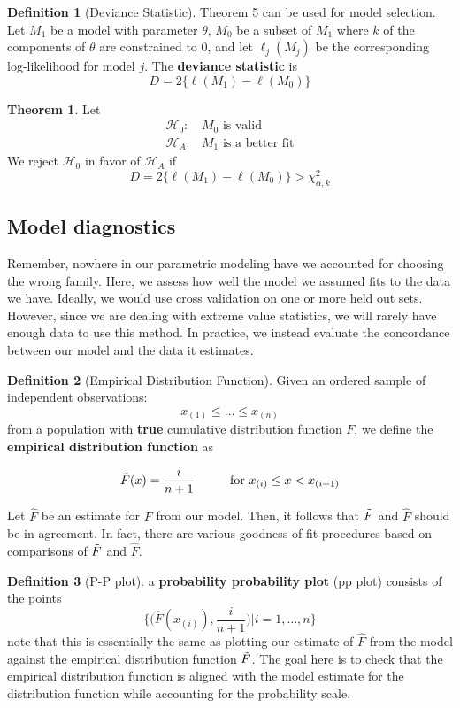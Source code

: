 \documentclass{article}
\theoremstyle{definition}
\newtheorem{theorem}{Theorem}
\theoremstyle{definition}
\newtheorem{definition}{Definition}
\def\l{\ell}
\begin{document}
\begin{definition}[Deviance Statistic]
Theorem 5 can be used for model selection. Let $M_1$ be a model with parameter $\theta$, $M_0$ be a subset of $M_1$ where $k$ of the components of $\theta$ are constrained to 0, and let $\l_j(M_j)$ be the corresponding log-likelihood for model $j$. The \textbf{deviance statistic} is
\[D=2\{\l(M_1) - \l(M_0)\}\]
\end{definition}

\begin{theorem}Let
\begin{align*}
    \mathcal{H}_0: & M_0 \text{ is valid}\\
    \mathcal{H}_A: & M_1 \text{ is a better fit}
\end{align*}
We reject $\mathcal{H}_0$ in favor of $\mathcal{H}_A$ if 
\[D=2\{\l(M_1) - \l(M_0)\}>\chi^2_{\alpha,k}\]
\end{theorem}
\subsection{Model diagnostics}
Remember, nowhere in our parametric modeling have we accounted for choosing the wrong family. Here, we assess how well the model we assumed fits to the data we have. Ideally, we would use cross validation on one or more held out sets. However, since we are dealing with extreme value statistics, we will rarely have enough data to use this method. In practice, we instead evaluate the concordance between our model and the data it estimates.
\begin{definition}[Empirical Distribution Function]
Given an ordered sample of independent observations:
\[x_{(1)}\leq \hdots \leq x_{(n)} \]
from a population with \textbf{true} cumulative distribution function $F$, we define the \textbf{empirical distribution function} as

\[\Tilde{F}(x)=\frac{i}{n+1} \hspace{1cm} \text{for } x_{(i)}\leq x< x_{(i+1)}\]
\end{definition}
Let $\hat{F}$ be an estimate for $F$ from our model. Then, it follows that $\Tilde{F}$ and $\hat{F}$ should be in agreement. In fact, there are various goodness of fit procedures based on comparisons of $\Tilde{F}$ and $\hat{F}$.

\begin{definition}[P-P plot] a \textbf{probability probability plot} (pp plot) consists of the points 
\[ \Bigg\{ \bigg(\hat{F}(x_{(i)}), \frac{i}{n+1}\bigg)| i=1, \hdots, n \Bigg\}\]
note that this is essentially the same as plotting our estimate of $\hat{F}$ from the model against the empirical distribution function $\Tilde{F}$. The goal here is to check that the empirical distribution function is aligned with the model estimate for the distribution function while accounting for the probability scale.
\end{definition}
\end{document}

